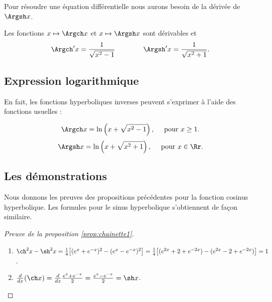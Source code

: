 \documentclass[class=report,crop=false]{standalone}
\begin{document}
\shorthandoff{:}
\shorthandon{:}

\bigskip

Pour résoudre une équation différentielle nous aurons besoin de la dérivée
de $\Argsh x$.
\begin{proposition}
\label{prop:chainette3}
Les fonctions $x \mapsto \Argch x$ et $x \mapsto \Argsh x$
sont dérivables et 
$$\Argch' x = \frac{1}{\sqrt{x^2-1}} \qquad\qquad \Argsh' x = \frac{1}{\sqrt{x^2+1}}.$$
\end{proposition}


\subsection{Expression logarithmique}

En fait, les fonctions hyperboliques inverses peuvent s'exprimer à l'aide 
des fonctions usuelles :
\begin{proposition}
\label{prop:chainette4}
$$\Argch x  =  \ln\left( x+\sqrt{x^2-1} \right), \quad \text{ pour } x\ge1.$$
$$\Argsh x  =  \ln\left( x+\sqrt{x^2+1} \right), \quad \text{ pour } x \in \Rr.$$
\end{proposition}


\subsection{Les démonstrations}

Nous donnons les preuves des propositions précédentes pour la fonction cosinus hyperbolique.
Les formules pour le sinus hyperbolique s'obtiennent de façon similaire.

\begin{proof}[Preuve de la proposition \ref{prop:chainette1}]
\begin{enumerate}
  \item $\ch^2 x- \sh^2 x = \frac14 \big[ (e^x+e^{-x})^2 - (e^x-e^{-x})^2 \big] = 
 \frac14 \big[ (e^{2x}+2+e^{-2x}) - (e^{2x}-2+e^{-2x})  \big] = 1$.

  \item $\frac{d}{dx}(\ch x) = \frac{d}{dx} \frac{e^x+e^{-x}}{2} = \frac{e^x-e^{-x}}{2}  = \sh x$.
\end{enumerate}
  
\end{proof}
\end{document}
